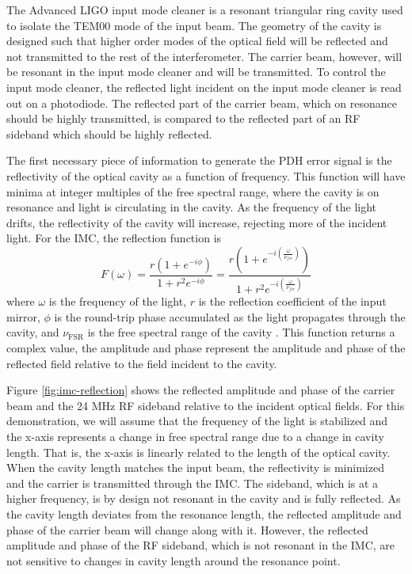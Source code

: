 The Advanced LIGO input mode cleaner is a resonant triangular ring cavity used to isolate 
the TEM00 mode of the input beam. The geometry of the cavity is designed such that 
higher order modes of the optical field will be reflected and not transmitted to 
the rest of the interferometer. The carrier beam, however, will be resonant in 
the input mode cleaner and will be transmitted. To control the input mode cleaner, 
the reflected 
light incident on the input mode cleaner is read out on a photodiode. The reflected 
part of the carrier beam, which on resonance should be highly transmitted, 
is compared to the reflected part of an RF sideband which should be highly 
reflected.

The first necessary piece of information to generate the PDH error signal is 
the reflectivity of the optical cavity as a function of frequency. This function 
will have minima at integer multiples of the free spectral range, where the 
cavity is on resonance and light is circulating in the cavity. As the frequency 
of the light drifts, the reflectivity of the cavity will increase, rejecting more 
of the incident light. For the IMC, 
the reflection function is 
\begin{equation}
F(\omega) = \frac{r(1 + e^{-i\phi})}{1+r^2e^{-i\phi}} = \frac{r(1 + e^{-i(\frac{\omega}{\nu_{fsr}})})}{1+r^2e^{-i(\frac{\omega}{\nu_{fsr}})}}
\end{equation}
where $\omega$ is the frequency of the light, $r$ is the reflection coefficient 
of the input mirror, $\phi$ is the round-trip phase 
accumulated as the light propagates through the cavity, 
and $\nu_{\mathrm{FSR}}$ is the free spectral range of the cavity \cite{Mueller}.
This function returns a complex value, the amplitude and phase represent the 
amplitude and phase of the reflected field relative to the field incident to 
the cavity.

Figure \ref{fig:imc-reflection} shows the reflected amplitude and phase of 
the carrier beam and the 24 MHz RF sideband relative to the incident optical 
fields. For this demonstration, 
we will assume that the frequency of the light is stabilized and the 
x-axis represents a change in free spectral range due to a change in 
cavity length. That is, the x-axis is linearly related to the length of the 
optical cavity. 
When the cavity length matches the input beam, the reflectivity is minimized and the 
carrier is transmitted through the IMC. The sideband, which is at a higher frequency, 
is by design not resonant in the cavity and is fully reflected.
As the cavity length deviates from the resonance length, the reflected amplitude and 
phase of the carrier 
beam will change along with it. However, the reflected amplitude and phase of the 
RF sideband, which is not resonant in the IMC, are not sensitive to changes in 
cavity length around the resonance point.

